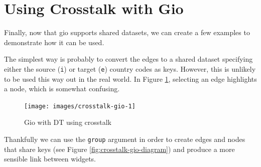 \documentclass[10pt,]{krantz}
\makeatletter
\newenvironment{Shaded}{\begin{snugshade}}{\end{snugshade}}
\newcommand{\CommentTok}[1]{\textcolor[rgb]{0.37,0.37,0.37}{\textit{#1}}}
\newcommand{\DataTypeTok}[1]{\textcolor[rgb]{0.27,0.27,0.27}{#1}}
\newcommand{\KeywordTok}[1]{\textcolor[rgb]{0.27,0.27,0.27}{\textbf{#1}}}
\newcommand{\NormalTok}[1]{#1}
\newcommand{\OperatorTok}[1]{\textcolor[rgb]{0.43,0.43,0.43}{\textbf{#1}}}
\newcommand{\StringTok}[1]{\textcolor[rgb]{0.5,0.5,0.5}{#1}}
\newenvironment{kframe}{%
\medskip{}
\setlength{\fboxsep}{.8em}
 \def\at@end@of@kframe{}%
 \ifinner\ifhmode%
  \def\at@end@of@kframe{\end{minipage}}%
  \begin{minipage}{\columnwidth}%
 \fi\fi%
 \def\FrameCommand##1{\hskip\@totalleftmargin \hskip-\fboxsep
 \colorbox{shadecolor}{##1}\hskip-\fboxsep
     \hskip-\linewidth \hskip-\@totalleftmargin \hskip\columnwidth}%
 \MakeFramed {\advance\hsize-\width
   \@totalleftmargin\z@ \linewidth\hsize
   \@setminipage}}%
 {\par\unskip\endMakeFramed%
 \at@end@of@kframe}
\renewenvironment{Shaded}{\begin{kframe}}{\end{kframe}}
\makeatother
\begin{document}
\hypertarget{linking-widgets-using}{%
\section{Using Crosstalk with Gio}\label{linking-widgets-using}}

Finally, now that gio supports shared datasets, we can create a few examples to demonstrate how it can be used.

The simplest way is probably to convert the edges to a shared dataset specifying either the source (\texttt{i}) or target (\texttt{e}) country codes as keys. However, this is unlikely to be used this way out in the real world. In Figure \ref{fig:crosstalk-gio-1}, selecting an edge highlights a node, which is somewhat confusing.

\begin{Shaded}
\end{Shaded}

\begin{figure}[H]

{\centering \texttt{[image: images/crosstalk-gio-1]} 

}

\caption{Gio with DT using crosstalk}\label{fig:crosstalk-gio-1}
\end{figure}

Thankfully we can use the \texttt{group} argument in order to create edges and nodes that share keys (see Figure \ref{fig:crosstalk-gio-diagram}) and produce a more sensible link between widgets.
\end{document}
